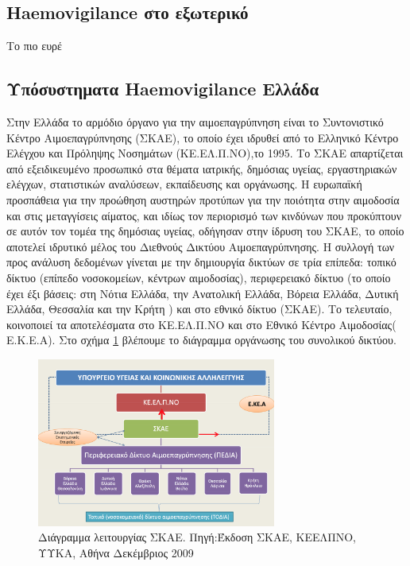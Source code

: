 	\subsection{Haemovigilance στο εξωτερικό}
	
	Το πιο ευρέ
	
		
	
	\subsection{Υπόσυστηματα Haemovigilance Ελλάδα}
	
	Στην Ελλάδα το αρμόδιο όργανο για την αιμοεπαγρύπνηση είναι το Συντονιστικό Κέντρο Αιμοεπαγρύπνησης (ΣΚΑΕ), το οποίο έχει ιδρυθεί από το Ελληνικό  Κέντρο Ελέγχου και Πρόληψης Νοσημάτων (ΚΕ.ΕΛ.Π.ΝΟ),το 1995. Το ΣΚΑΕ απαρτίζεται από εξειδικευμένο προσωπικό στα θέματα ιατρικής, δημόσιας υγείας, εργαστηριακών ελέγχων, στατιστικών αναλύσεων, εκπαίδευσης και οργάνωσης. Η ευρωπαϊκή προσπάθεια για την προώθηση αυστηρών προτύπων για την ποιότητα στην αιμοδοσία και στις μεταγγίσεις αίματος, και ιδίως τον περιορισμό των κινδύνων που προκύπτουν σε αυτόν τον τομέα της δημόσιας υγείας, οδήγησαν στην ίδρυση του ΣΚΑΕ, το οποίο αποτελεί ιδρυτικό μέλος του Διεθνούς Δικτύου Αιμοεπαγρύπνησης. 
	Η συλλογή των προς ανάλυση δεδομένων γίνεται με την δημιουργία δικτύων σε τρία επίπεδα: τοπικό δίκτυο (επίπεδο νοσοκομείων, κέντρων αιμοδοσίας), περιφερειακό δίκτυο (το οποίο έχει έξι βάσεις:  στη Νότια Ελλάδα, την Ανατολική Ελλάδα, Βόρεια Ελλάδα, Δυτική Ελλάδα, Θεσσαλία και την Κρήτη ) και στο εθνικό δίκτυο (ΣΚΑΕ). Το τελευταίο, κοινοποιεί τα αποτελέσματα στο ΚΕ.ΕΛ.Π.ΝΟ και στο Εθνικό Κέντρο Αιμοδοσίας( Ε.Κ.Ε.Α). Στο σχήμα \ref{fig:SKAE_diagram} βλέπουμε το διάγραμμα οργάνωσης του συνολικού δικτύου.
	
\begin{figure}[h!]
	    \centering
	    \includegraphics[width=0.7\textwidth]{SKAE_diagram.jpg}
	    \caption{Διάγραμμα λειτουργίας ΣΚΑΕ. Πηγή:Έκδοση ΣΚΑΕ, ΚΕΕΛΠΝΟ, ΥΥΚΑ, Αθήνα Δεκέμβριος 2009}
	    \label{fig:SKAE_diagram}
\end{figure}	

